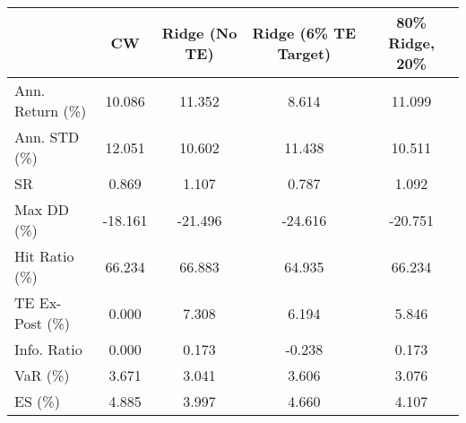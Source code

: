 \begin{tabular}{lcccc}
\toprule
{} &      CW &  Ridge (No TE) &  Ridge (6\% TE Target) &  80\% Ridge, 20\% \\
\midrule
Ann. Return (\%) &  10.086 &         11.352 &                 8.614 &          11.099 \\
Ann. STD (\%)    &  12.051 &         10.602 &                11.438 &          10.511 \\
SR              &   0.869 &          1.107 &                 0.787 &           1.092 \\
Max DD (\%)      & -18.161 &        -21.496 &               -24.616 &         -20.751 \\
Hit Ratio (\%)   &  66.234 &         66.883 &                64.935 &          66.234 \\
TE Ex-Post (\%)  &   0.000 &          7.308 &                 6.194 &           5.846 \\
Info. Ratio     &   0.000 &          0.173 &                -0.238 &           0.173 \\
VaR (\%)         &   3.671 &          3.041 &                 3.606 &           3.076 \\
ES (\%)          &   4.885 &          3.997 &                 4.660 &           4.107 \\
\bottomrule
\end{tabular}
